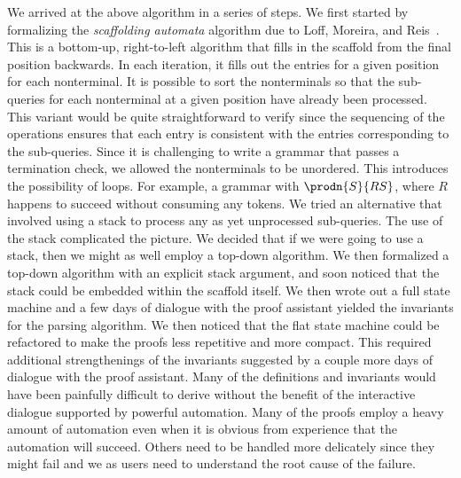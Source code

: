 We arrived at the above algorithm in a series of steps.  We first
started by formalizing the \emph{scaffolding automata} algorithm due
to Loff, Moreira, and Reis~\cite{loff2020computational}.  This is a
bottom-up, right-to-left algorithm that fills in the scaffold from the
final position backwards.  In each iteration, it fills out the entries
for a given position for each nonterminal.  It is possible to sort the
nonterminals so that the sub-queries for each nonterminal at a given
position have already been processed.  This variant would be quite
straightforward to verify since the sequencing of the operations
ensures that each entry is consistent with the entries corresponding
to the sub-queries.  Since it is challenging to write a grammar that
passes a termination check, we allowed the nonterminals to be
unordered.  This introduces the possibility of loops.  For example, a
grammar with $\prodn{S}{R S}$, where $R$ happens to succeed without
consuming any tokens.  We tried an alternative that involved using a
stack to process any as yet unprocessed sub-queries.  The use of the
stack complicated the picture.  We decided that if we were going to
use a stack, then we might as well employ a top-down algorithm.  We
then formalized a top-down algorithm with an explicit stack argument,
and soon noticed that the stack could be embedded within the scaffold
itself.  We then wrote out a full state machine and a few days of
dialogue with the proof assistant yielded the invariants for the
parsing algorithm.  We then noticed that the flat state machine could
be refactored to make the proofs less repetitive and more compact.
This required additional strengthenings of the invariants suggested by
a couple more days of dialogue with the proof assistant.  Many of the
definitions and invariants would have been painfully difficult to
derive without the benefit of the interactive dialogue supported by
powerful automation.  Many of the proofs employ a heavy amount of
automation even when it is obvious from experience that the automation
will succeed.  Others need to be handled more delicately since they
might fail and we as users need to understand the root cause of the
failure.

